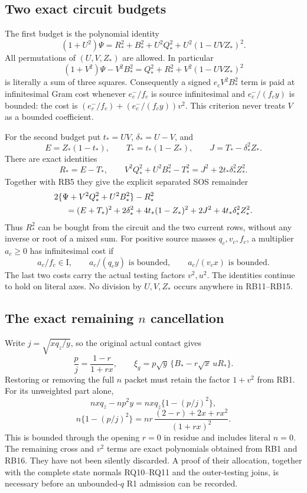 \subsection{Two exact circuit budgets}

The first budget is the polynomial identity
\[
 (1+U^2)\Psi
 =R_*^2+B_*^2+U^2Q_*^2+U^2(1-UVZ_*)^2.
\tag{RB11}
\]
All permutations of $(U,V,Z_*)$ are allowed. In particular
\[
 (1+V^2)\Psi-V^2B_*^2
       =Q_*^2+R_*^2+V^2(1-UVZ_*)^2
\tag{RB12}
\]
is literally a sum of three squares. Consequently a signed
$e_cV^2B_*^2$ term is paid at infinitesimal Gram cost whenever
$e_c^-/f_c$ is source infinitesimal and
$e_c^-/(f_cy)$ is bounded: the cost is
$(e_c^-/f_c)+(e_c^-/(f_cy))v^2$. This criterion never treats
$V$ as a bounded coefficient.

For the second budget put $t_*=UV$, $\delta_*=U-V$, and
\[
 E=Z_*(1-t_*),\qquad T_*=t_*(1-Z_*),\qquad
 J=T_*-\delta_*^2Z_*.
\]
There are exact identities
\[
 R_*=E-T_*,\qquad
 V^2Q_*^2+U^2B_*^2-T_*^2
                =J^2+2t_*\delta_*^2Z_*^2.
\tag{RB13}
\]
Together with RB5 they give the explicit separated SOS remainder
\begin{align*}
&2\{\Psi+V^2Q_*^2+U^2B_*^2\}-R_*^2\\
&\hspace{5mm}=(E+T_*)^2+2\delta_*^2+
 4t_*(1-Z_*)^2+2J^2+4t_*\delta_*^2Z_*^2 .
\end{align*}
Thus $R_*^2$ can be bought from the circuit and the two current rows,
without any inverse or root of a mixed sum.
For positive source masses $q_c,v_c,f_c$, a multiplier $a_c\ge0$
has infinitesimal cost if
\[
 a_c/f_c\in\mathrm I,\qquad
 a_c/(q_cy)\text{ is bounded},\qquad
 a_c/(v_cx)\text{ is bounded}.
\tag{RB15}
\]
The last two costs carry the actual testing factors $v^2,u^2$.
The identities continue to hold on literal axes. No division by
$U,V,Z_*$ occurs anywhere in RB11--RB15.

\subsection{The exact remaining $n$ cancellation}

Write $j=\sqrt{xq_z/y}$, so the original actual contact gives
\[
 \frac pj=\frac{1-r}{1+rx},\qquad
 \xi_g=p\sqrt y\,\{B_*-r\sqrt x\,uR_*\}.
\tag{RB16}
\]
Restoring or removing the full $n$ packet must retain the factor
$1+v^2$ from RB1. For its unweighted part alone,
\[
 nxq_z-np^2y=nxq_z\{1-(p/j)^2\},
\]
\[
 n\{1-(p/j)^2\}
 =nr\,\frac{(2-r)+2x+rx^2}{(1+rx)^2}.
\tag{RB17}
\]
This is bounded through the opening $r=0$ in residue and includes
literal $n=0$. The remaining cross and $v^2$ terms are exact
polynomials obtained from RB1 and RB16. They have not been silently
discarded. A proof of their allocation, together with the complete
state normals RQ10--RQ11 and the outer-testing joins, is necessary
before an unbounded-$q$ R1 admission can be recorded.
